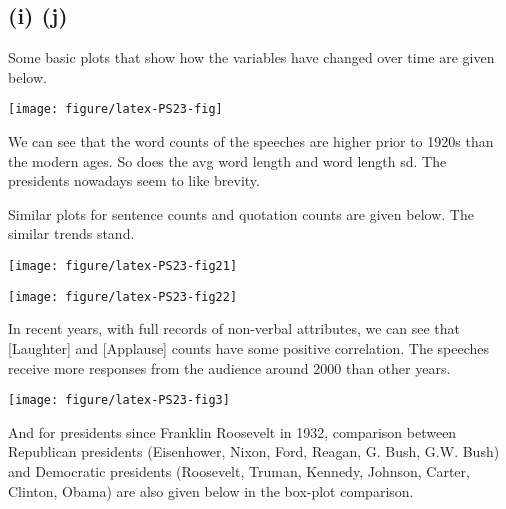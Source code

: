 \documentclass{article}\usepackage{graphicx, color}
\makeatletter
\def\maxwidth{ %
  \ifdim\Gin@nat@width>\linewidth
    \linewidth
  \else
    \Gin@nat@width
  \fi
}
\newenvironment{knitrout}{}{} %
\makeatother
\begin{document}
\subsection*{(i) (j)}

Some basic plots that show how the variables have changed over time are given below.





\begin{knitrout}
\color{fgcolor}

{\centering \texttt{[image: figure/latex-PS23-fig]} 

}


\end{knitrout}


We can see that the word counts of the speeches are higher prior to 1920s than the modern ages.
So does the avg word length and word length sd. The presidents nowadays seem to like brevity.


Similar plots for sentence counts and quotation counts are given below. The similar trends stand.

\begin{knitrout}
\color{fgcolor}

{\centering \texttt{[image: figure/latex-PS23-fig21]} 

}



{\centering \texttt{[image: figure/latex-PS23-fig22]} 

}


\end{knitrout}


In recent years, with full records of non-verbal attributes, we can see that [Laughter] and [Applause] counts
have some positive correlation. The speeches receive more responses from the audience around 2000 than other years.


\begin{knitrout}
\color{fgcolor}

{\centering \texttt{[image: figure/latex-PS23-fig3]} 

}


\end{knitrout}


And for presidents since Franklin Roosevelt in 1932, comparison between Republican presidents 
(Eisenhower, Nixon, Ford, Reagan, G. Bush, G.W. Bush) and Democratic presidents 
(Roosevelt, Truman, Kennedy, Johnson, Carter, Clinton, Obama) are also given below in the box-plot comparison.
\end{document}
